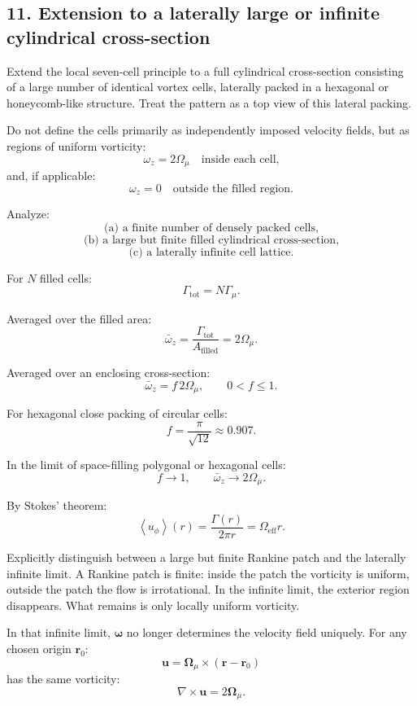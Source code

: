 \documentclass[11pt,a4paper]{article}
\begin{document}
\subsection{11. Extension to a laterally large or infinite cylindrical cross-section}

Extend the local seven-cell principle to a full cylindrical cross-section consisting of a large number of identical vortex cells, laterally packed in a hexagonal or honeycomb-like structure. Treat the pattern as a top view of this lateral packing.

Do not define the cells primarily as independently imposed velocity fields, but as regions of uniform vorticity:
\[
\omega_z = 2\Omega_{\mu}
\quad \text{inside each cell,}
\]
and, if applicable:
\[
\omega_z = 0
\quad \text{outside the filled region.}
\]

Analyze:
\[
\text{(a) a finite number of densely packed cells,}
\]
\[
\text{(b) a large but finite filled cylindrical cross-section,}
\]
\[
\text{(c) a laterally infinite cell lattice.}
\]

For \(N\) filled cells:
\[
\Gamma_{\mathrm{tot}}=N\Gamma_{\mu}.
\]

Averaged over the filled area:
\[
\bar{\omega}_z
=
\frac{\Gamma_{\mathrm{tot}}}{A_{\mathrm{filled}}}
=
2\Omega_{\mu}.
\]

Averaged over an enclosing cross-section:
\[
\bar{\omega}_z=f\,2\Omega_{\mu},
\qquad
0<f\leq1.
\]

For hexagonal close packing of circular cells:
\[
f=\frac{\pi}{\sqrt{12}}\approx0.907.
\]

In the limit of space-filling polygonal or hexagonal cells:
\[
f\rightarrow1,
\qquad
\bar{\omega}_z\rightarrow2\Omega_{\mu}.
\]

By Stokes' theorem:
\[
\left\langle u_{\phi}\right\rangle(r)
=
\frac{\Gamma(r)}{2\pi r}
=
\Omega_{\mathrm{eff}}r.
\]

Explicitly distinguish between a large but finite Rankine patch and the laterally infinite limit. A Rankine patch is finite: inside the patch the vorticity is uniform, outside the patch the flow is irrotational. In the infinite limit, the exterior region disappears. What remains is only locally uniform vorticity.

In that infinite limit, \(\boldsymbol{\omega}\) no longer determines the velocity field uniquely. For any chosen origin \(\mathbf{r}_0\):
\[
\mathbf{u}
=
\boldsymbol{\Omega}_{\mu}
\times
(\mathbf{r}-\mathbf{r}_0)
\]
has the same vorticity:
\[
\nabla\times\mathbf{u}
=
2\boldsymbol{\Omega}_{\mu}.
\]
\end{document}
